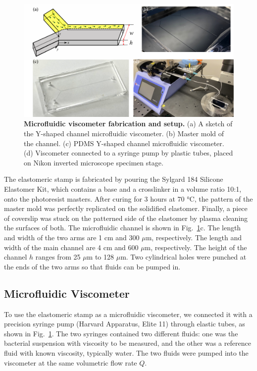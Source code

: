 \begin{figure}[!h]
	\begin{center}
	\includegraphics[width=5.5 in]{Figs/2-Exp/7.pdf}
	\end{center}
	\caption[Microfluidic viscometer fabrication and setup.]
	{
	\textbf{Microfluidic viscometer fabrication and setup.}
	(a) A sketch of the Y-shaped channel microfluidic viscometer.
	(b) Master mold of the channel.
	(c) PDMS Y-shaped channel microfluidic viscometer.
	(d) Viscometer connected to a syringe pump by plastic tubes, placed on Nikon inverted microscope specimen stage.
	}
	\label{fig:experiment-microfluidics}
\end{figure}

The elastomeric stamp is fabricated by pouring the Sylgard 184 Silicone Elastomer Kit, which contains a base and a crosslinker in a volume ratio 10:1, onto the photoresist masters. After curing for 3 hours at 70 °C, the pattern of the master mold was perfectly replicated on the solidified elastomer. Finally, a piece of coverslip was stuck on the patterned side of the elastomer by plasma cleaning the surfaces of both. The microfluidic channel is shown in Fig.~\ref{fig:experiment-microfluidics}c. The length and width of the two arms are 1 cm and 300 $\mu$m, respectively. The length and width of the main channel are 4 cm and 600 $\mu$m, respectively. The height of the channel $h$ ranges from 25 $\mu$m to 128 $\mu$m. Two cylindrical holes were punched at the ends of the two arms so that fluids can be pumped in.

\subsection{Microfluidic Viscometer}


To use the elastomeric stamp as a microfluidic viscometer, we connected it with a precision syringe pump (Harvard Apparatus, Elite 11) through elastic tubes, as shown in Fig.~\ref{fig:experiment-microfluidics}. The two syringes contained two different fluids: one was the bacterial suspension with viscosity to be measured, and the other was a reference fluid with known viscosity, typically water. The two fluids were pumped into the viscometer at the same volumetric flow rate $Q$.

